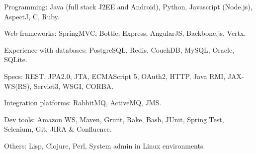 \begin{rlist}
  \item Programming: Java (full stack J2EE and Android), Python, Javascript (Node.js),
  AspectJ, C, Ruby.
  \item Web frameworks: SpringMVC, Bottle, Express, AngularJS, Backbone.js, Vertx.
  \item Experience with databases: PostgreSQL, Redis, CouchDB, MySQL, Oracle, SQLite.
  \item Specs: REST, JPA2.0, JTA, ECMAScript 5, OAuth2, HTTP,
  Java RMI, JAX-WS(RS), Servlet3, WSGI, CORBA.
  \item Integration platforms: RabbitMQ, ActiveMQ, JMS.
  \item Dev tools: Amazon WS, Maven, Grunt, Rake, Bash, JUnit, Spring Test,
  Selenium, Git, JIRA \& Confluence.
  \item Others: Lisp, Clojure, Perl, System admin in Linux
  environments.
\end{rlist}

